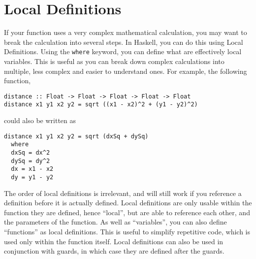 \section*{Local Definitions}

If your function uses a very complex mathematical calculation, you may want to break the calculation into several steps.
 In Haskell, you can do this using Local Definitions. Using the \verb_where_ keyword, you can define what are
 effectively local variables. This is useful as you can break down complex calculations into multiple, less complex and
 easier to understand ones. For example, the following function,
\begin{verbatim}
distance :: Float -> Float -> Float -> Float -> Float
distance x1 y1 x2 y2 = sqrt ((x1 - x2)^2 + (y1 - y2)^2)
\end{verbatim}
could also be written as
\begin{verbatim}
distance x1 y1 x2 y2 = sqrt (dxSq + dySq)
  where
  dxSq = dx^2
  dySq = dy^2
  dx = x1 - x2
  dy = y1 - y2
\end{verbatim}
The order of local definitions is irrelevant, and will still work if you reference a definition before it is actually
 defined. Local definitions are only usable within the function they are defined, hence ``local'', but are able to
 reference each other, and the parameters of the function. As well as ``variables'', you can also define ``functions''
 as local definitions. This is useful to simplify repetitive code, which is used only within the function itself. Local
 definitions can also be used in conjunction with guards, in which case they are defined after the guards.